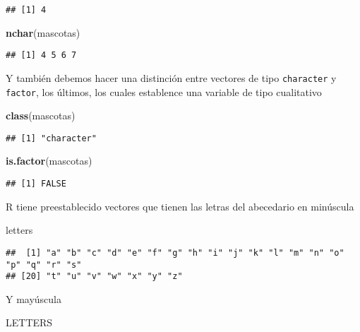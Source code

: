 \documentclass[]{article}
\newenvironment{Shaded}{\begin{snugshade}}{\end{snugshade}}
\newcommand{\KeywordTok}[1]{\textcolor[rgb]{0.13,0.29,0.53}{\textbf{#1}}}
\newcommand{\NormalTok}[1]{#1}
\begin{document}
\begin{verbatim}
## [1] 4
\end{verbatim}

\begin{Shaded}
\begin{Highlighting}[]
\KeywordTok{nchar}\NormalTok{(mascotas)}
\end{Highlighting}
\end{Shaded}

\begin{verbatim}
## [1] 4 5 6 7
\end{verbatim}

Y también debemos hacer una distinción entre vectores de tipo
\texttt{character} y \texttt{factor}, los últimos, los cuales establence
una variable de tipo cualitativo

\begin{Shaded}
\begin{Highlighting}[]
\KeywordTok{class}\NormalTok{(mascotas)}
\end{Highlighting}
\end{Shaded}

\begin{verbatim}
## [1] "character"
\end{verbatim}

\begin{Shaded}
\begin{Highlighting}[]
\KeywordTok{is.factor}\NormalTok{(mascotas)}
\end{Highlighting}
\end{Shaded}

\begin{verbatim}
## [1] FALSE
\end{verbatim}

R tiene preestablecido vectores que tienen las letras del abecedario en
minúscula

\begin{Shaded}
\begin{Highlighting}[]
\NormalTok{letters}
\end{Highlighting}
\end{Shaded}

\begin{verbatim}
##  [1] "a" "b" "c" "d" "e" "f" "g" "h" "i" "j" "k" "l" "m" "n" "o" "p" "q" "r" "s"
## [20] "t" "u" "v" "w" "x" "y" "z"
\end{verbatim}

Y mayúscula

\begin{Shaded}
\begin{Highlighting}[]
\NormalTok{LETTERS}
\end{Highlighting}
\end{Shaded}
\end{document}
